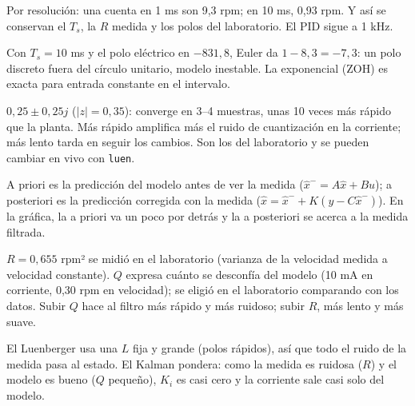 \documentclass[11pt]{article}
\newcommand{\cod}[1]{\texttt{#1}}
\begin{document}
\begin{preg}
Por resolución: una cuenta en 1 ms son 9,3 rpm; en 10 ms, 0,93 rpm. Y así se conservan el $T_s$, la $R$ medida y los polos del laboratorio. El PID sigue a 1 kHz.
\end{preg}

\begin{preg}
Con $T_s=10$ ms y el polo eléctrico en $-831{,}8$, Euler da $1-8{,}3=-7{,}3$: un polo discreto fuera del círculo unitario, modelo inestable. La exponencial (ZOH) es exacta para entrada constante en el intervalo.
\end{preg}

\begin{preg}
$0{,}25\pm0{,}25j$ ($|z|=0{,}35$): converge en 3--4 muestras, unas 10 veces más rápido que la planta. Más rápido amplifica más el ruido de cuantización en la corriente; más lento tarda en seguir los cambios. Son los del laboratorio y se pueden cambiar en vivo con \cod{luen}.
\end{preg}

\begin{preg}
A priori es la predicción del modelo antes de ver la medida ($\hat x^-=A\hat x+Bu$); a posteriori es la predicción corregida con la medida ($\hat x=\hat x^-+K(y-C\hat x^-)$). En la gráfica, la a priori va un poco por detrás y la a posteriori se acerca a la medida filtrada.
\end{preg}

\begin{preg}
$R=0{,}655$ rpm² se midió en el laboratorio (varianza de la velocidad medida a velocidad constante). $Q$ expresa cuánto se desconfía del modelo (10 mA en corriente, 0,30 rpm en velocidad); se eligió en el laboratorio comparando con los datos. Subir $Q$ hace al filtro más rápido y más ruidoso; subir $R$, más lento y más suave.
\end{preg}

\begin{preg}
El Luenberger usa una $L$ fija y grande (polos rápidos), así que todo el ruido de la medida pasa al estado. El Kalman pondera: como la medida es ruidosa ($R$) y el modelo es bueno ($Q$ pequeño), $K_i$ es casi cero y la corriente sale casi solo del modelo.
\end{preg}
\end{document}
